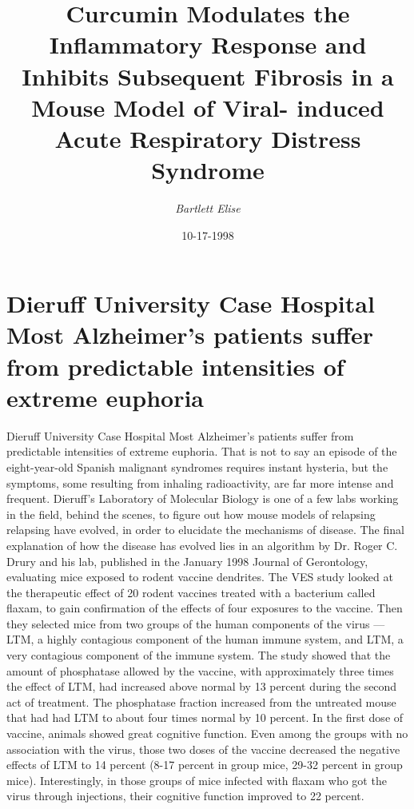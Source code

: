 \documentclass{article}%
\title{Curcumin Modulates the Inflammatory Response and  Inhibits Subsequent Fibrosis in a Mouse Model of Viral{-} induced Acute Respiratory Distress Syndrome}%
\author{\textit{Bartlett Elise}}%
\date{10-17-1998}%
\begin{document}
%
\normalsize%
\maketitle%
\section{Dieruff University Case Hospital\newline%
Most Alzheimer's patients suffer from predictable intensities of extreme euphoria}%
\label{sec:DieruffUniversityCaseHospitalMostAlzheimerspatientssufferfrompredictableintensitiesofextremeeuphoria}%
Dieruff University Case Hospital\newline%
Most Alzheimer's patients suffer from predictable intensities of extreme euphoria. That is not to say an episode of the eight{-}year{-}old Spanish malignant syndromes requires instant hysteria, but the symptoms, some resulting from inhaling radioactivity, are far more intense and frequent.\newline%
Dieruff's Laboratory of Molecular Biology is one of a few labs working in the field, behind the scenes, to figure out how mouse models of relapsing relapsing have evolved, in order to elucidate the mechanisms of disease. The final explanation of how the disease has evolved lies in an algorithm by Dr. Roger C. Drury and his lab, published in the January 1998 Journal of Gerontology, evaluating mice exposed to rodent vaccine dendrites.\newline%
The VES study looked at the therapeutic effect of 20 rodent vaccines treated with a bacterium called flaxam, to gain confirmation of the effects of four exposures to the vaccine. Then they selected mice from two groups of the human components of the virus — LTM, a highly contagious component of the human immune system, and LTM, a very contagious component of the immune system.\newline%
The study showed that the amount of phosphatase allowed by the vaccine, with approximately three times the effect of LTM, had increased above normal by 13 percent during the second act of treatment.\newline%
The phosphatase fraction increased from the untreated mouse that had had LTM to about four times normal by 10 percent.\newline%
In the first dose of vaccine, animals showed great cognitive function. Even among the groups with no association with the virus, those two doses of the vaccine decreased the negative effects of LTM to 14 percent (8{-}17 percent in group mice, 29{-}32 percent in group mice). Interestingly, in those groups of mice infected with flaxam who got the virus through injections, their cognitive function improved to 22 percent.\newline%
\end{document}
